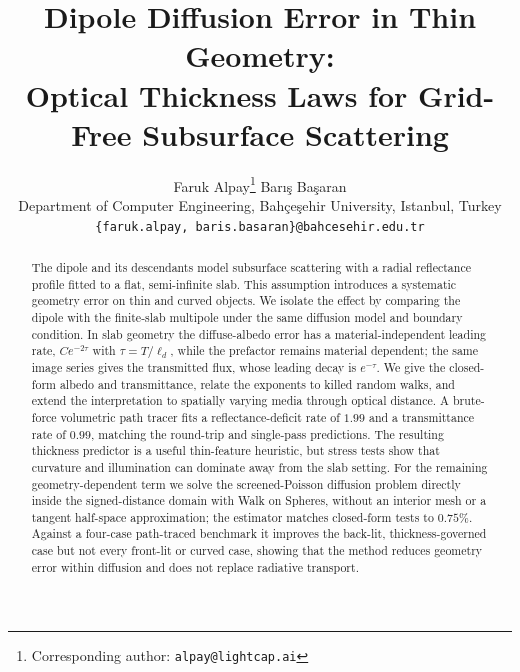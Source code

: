 \documentclass[11pt]{article}
\title{\vspace{-1.5em}Dipole Diffusion Error in Thin Geometry:\\
Optical Thickness Laws for Grid-Free Subsurface Scattering}
\author{Faruk Alpay\thanks{Corresponding author: \texttt{alpay@lightcap.ai}} \quad Barış Başaran\\[3pt]
  \small Department of Computer Engineering, Bahçeşehir University, Istanbul, Turkey\\[-1pt]
  \small \texttt{\{faruk.alpay, baris.basaran\}@bahcesehir.edu.tr}}
\date{}
\providecommand{\RMaxRelErr}{0.00}
\providecommand{\RReflRateBrute}{0.00}
\providecommand{\RTrRateBrute}{0.00}
\renewcommand{\RMaxRelErr}{0.75}
\renewcommand{\RReflRateBrute}{1.99}
\renewcommand{\RTrRateBrute}{0.99}
\newcommand{\ld}{\ell_d}
\begin{document}
\maketitle

\begin{abstract}
\noindent
The dipole and its descendants model subsurface scattering with a radial
reflectance profile fitted to a flat, semi-infinite slab. This assumption
introduces a systematic geometry error on thin and curved objects. We isolate the
effect by comparing the dipole with the finite-slab multipole under the same
diffusion model and boundary condition. In slab geometry the diffuse-albedo error
has a material-independent leading rate, $C e^{-2\tau}$ with $\tau=T/\ld$, while
the prefactor remains material dependent; the same image series gives the
transmitted flux, whose leading decay is $e^{-\tau}$. We give the closed-form
albedo and transmittance, relate the exponents to killed random walks, and extend
the interpretation to spatially varying media through optical distance. A
brute-force volumetric path tracer fits a reflectance-deficit rate of
$\RReflRateBrute$ and a transmittance rate of $\RTrRateBrute$, matching the
round-trip and single-pass predictions. The resulting thickness predictor is a
useful thin-feature heuristic, but stress tests show that curvature and
illumination can dominate away from the slab setting. For the remaining
geometry-dependent term we solve the screened-Poisson diffusion problem directly
inside the signed-distance domain with Walk on Spheres, without an interior mesh
or a tangent half-space approximation; the estimator matches closed-form tests to
$\RMaxRelErr\%$. Against a four-case path-traced benchmark it improves the
back-lit, thickness-governed case but not every front-lit or curved case, showing that the method reduces geometry error within diffusion and does not
replace radiative transport.
\end{abstract}
\end{document}
